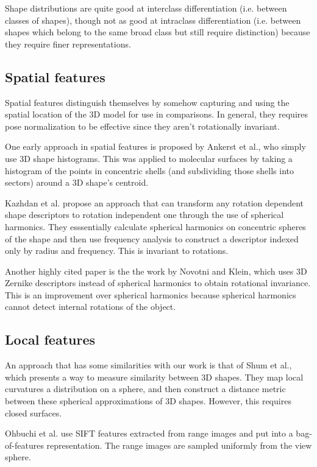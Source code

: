 \documentclass[../tech_report_1.tex]{subfiles}
\begin{document}
Shape distributions are quite good at interclass differentiation (i.e. between classes of shapes), though not as good at intraclass differentiation\cite{tangelder2008survey} (i.e. between shapes which belong to the same broad class but still require distinction) because they require finer representations.

\subsection{Spatial features}

Spatial features distinguish themselves by somehow capturing and using the spatial location of the 3D model for use in comparisons. In general, they requires pose normalization to be effective since they aren't rotationally invariant.

One early approach in spatial features is proposed by Ankerst et al.\cite{ankerst19993d}, who simply use 3D shape histograms. This was applied to molecular surfaces by taking a histogram of the points in concentric shells (and subdividing those shells into sectors) around a 3D shape's centroid.

Kazhdan et al.\cite{kazhdan2003rotation} propose an approach that can transform any rotation dependent shape descriptors to rotation independent one through the use of spherical harmonics. They esssentially calculate spherical harmonics on concentric spheres of the shape and then use frequency analysis to construct a descriptor indexed only by radius and frequency. This is invariant to rotations.

Another highly cited paper is the the work by Novotni and Klein\cite{novotni20033d}, which uses 3D Zernike descriptors instead of spherical harmonics to obtain rotational invariance. This is an improvement over spherical harmonics because spherical harmonics cannot detect internal rotations of the object.

\subsection{Local features}

An approach that has some similarities with our work is that of Shum et al., which presents a way to measure similarity between 3D shapes. They map local curvatures a distribution on a sphere, and then construct a distance metric between these spherical approximations of 3D shapes. However, this requires closed surfaces.

Ohbuchi et al.\cite{ohbuchi2008salient} use SIFT features extracted from range images and put into a bag-of-features representation. The range images are sampled uniformly from the view sphere.
\end{document}
